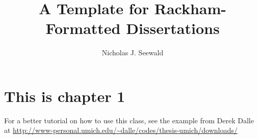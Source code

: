 \documentclass[thesis,12pt]{rackhamdissertation}
\title{A Template for Rackham-Formatted Dissertations}
\author{Nicholas J. Seewald}
\begin{document}
	\chapter{This is chapter 1}
	
	For a better tutorial on how to use this class, see the example from Derek Dalle at  \url{http://www-personal.umich.edu/~dalle/codes/thesis-umich/downloads/}

	
	\printbibliography[heading=thesisbib]
\end{document}
